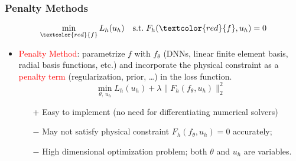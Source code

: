 \documentclass[usenames,dvipsnames]{beamer}
\begin{document}
\begin{frame}
	\frametitle{Penalty Methods}
	\begin{equation*}
		\min_{\textcolor{red}{f}} L_h(u_h) \quad \mathrm{s.t.}\; F_h(\textcolor{red}{f}, u_h) = 0
	\end{equation*}
	\begin{itemize}
		\item \textcolor{red}{Penalty Method}: parametrize $f$ with $f_\theta$ (DNNs, linear finite element basis, radial basis functions, etc.) and incorporate the physical constraint as a \textcolor{red}{penalty term} (regularization, prior, \ldots) in the loss function.
		\begin{equation*}
			\min_{\theta,\,u_h} L_h(u_h) + \lambda\|F_h(f_\theta, u_h)\|_2^2
		\end{equation*}
		\begin{itemize}
			\item[+] Easy to implement (no need for differentiating numerical solvers) 
			\item[$-$] May not satisfy physical constraint $F_h(f_\theta, u_h)=0$ accurately;
			
			\item[$-$] High dimensional optimization problem; both $\theta$ and $u_h$ are variables.
		\end{itemize}
	\end{itemize}
\end{frame}
\end{document}
